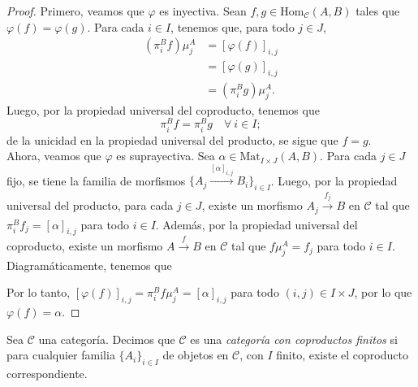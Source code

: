 \documentclass[tesis]{subfiles}
\begin{document}
\begin{proof}

    Primero, veamos que $\varphi$ es inyectiva. Sean $f,g\in\text{Hom}_\mathscr{C}(A,B)$ tales que $\varphi(f)=\varphi(g)$. Para cada $i\in I$, tenemos que, para todo $j\in J$,
    \begin{align*}
        (\pi_i^Bf)\mu_j^A &= [\varphi(f)]_{i,j} \\
                          &= [\varphi(g)]_{i,j} \\
                          &= (\pi_i^Bg)\mu_j^A.
    \end{align*}
    Luego, por la propiedad universal del coproducto, tenemos que
    \[
    \pi_i^Bf = \pi_i^Bg \quad \forall \ i\in I;
    \] 
    de la unicidad en la propiedad universal del producto, se sigue que $f=g$. \\
    
    Ahora, veamos que $\varphi$ es suprayectiva. Sea $\alpha\in \text{Mat}_{I\times J}(A,B)$. Para cada $j\in J$ fijo, se tiene la familia de morfismos $\{A_j\xrightarrow[]{[\alpha]_{i,j}} B_i\}_{i\in I}$. Luego, por la propiedad universal del producto, para cada $j\in J$, existe un morfismo $A_j\xrightarrow[]{f_j} B$ en $\mathscr{C}$ tal que $\pi_i^Bf_j=[\alpha]_{i,j}$ para todo $i\in I$. Además, por la propiedad universal del coproducto, existe un morfismo $A\xrightarrow[]{f} B$ en $\mathscr{C}$ tal que $f\mu_j^A=f_j$ para todo $i\in I$. Diagramáticamente, tenemos que
    \begin{center}
    \end{center}
    Por lo tanto, $[\varphi(f)]_{i,j} = \pi_i^Bf\mu_j^A = [\alpha]_{i,j}$ para todo $(i,j)\in I\times J$, por lo que $\varphi(f)=\alpha$.
\end{proof}

\begin{Def}\label{Def: Categoría con coproductos finitos}
    Sea $\mathscr{C}$ una categoría. Decimos que $\mathscr{C}$ es una \emph{categoría con coproductos finitos} si para cualquier familia $\{A_i\}_{i\in I}$ de objetos en $\mathscr{C}$, con $I$ finito, existe el coproducto correspondiente.
\end{Def}
\end{document}
